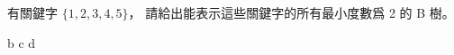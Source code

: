 \startEXERCISE
有關鍵字 $\{1,2,3,4,5\}$，
請給出能表示這些關鍵字的所有最小度數爲 2 的 B 樹。
\stopEXERCISE

\startANSWER
{}
{\externalfigure[e18_1-3-2]}{b}
{\externalfigure[e18_1-3-3]}{c}
{\externalfigure[e18_1-3-4]}{d}
\stopcombination
\stopANSWER
